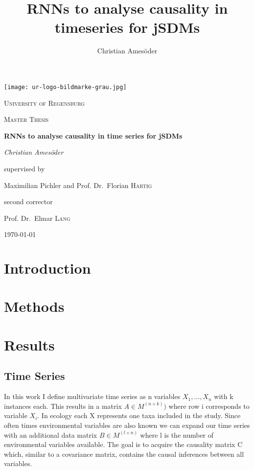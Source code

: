 \documentclass[a4paper]{report}
\begin{document}
 
	
	\author{Christian Ames\"oder}

\title {RNNs to analyse causality in timeseries for jSDMs}

\begin{titlepage}
	\centering
	\texttt{[image: ur-logo-bildmarke-grau.jpg]}\par\vspace{1cm}
	{\scshape \LARGE University of Regensburg\par}
	\vspace{1cm}
	{\scshape\Large Master Thesis\par}
	\vspace{1.5cm}
	{\huge\bfseries RNNs to analyse causality in time series for jSDMs\par}
	\vspace{2cm}
	{\Large\itshape Christian Ames\"oder\par}
	\vfill
	supervised by\par
	Maximilian Pichler and Prof. Dr.~Florian \textsc{Hartig}
	
	\vfill
	
	second corrector \par
	Prof. Dr.~Elmar \textsc{Lang}
	\vfill
	
	{\large \today\par}
\end{titlepage}


	\tableofcontents


	\chapter{Introduction}
	
	\chapter{Methods}
	
	\chapter{Results}
	\section{Time Series}
	In this work I define multivariate time series as n variables $X_1,..., X_n$ with k instances each. This results in a matrix $A \in M^(n \times k))$ where row i corresponds to variable $X_i$. In ecology each X represents one taxa included in the study. Since often times environmental variables are also known we can expand our time series with an additional data matrix $B \in M^(l \times n)$ where l is the number of environmental variables available.
	The goal is to acquire the causality matrix C which, similar to a covariance matrix, contains the causal inferences between all variables.
	
\end{document}
